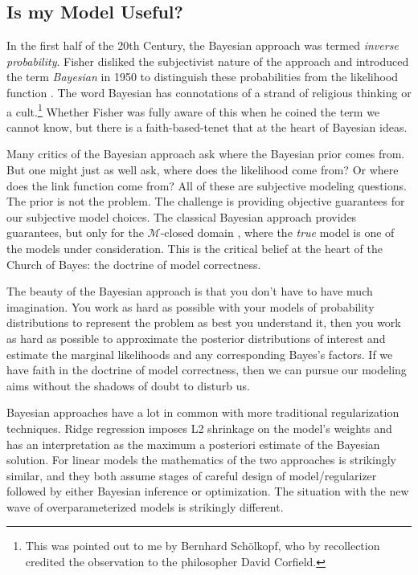\documentclass[a4paperpaper,]{article}
\begin{document}
\hypertarget{is-my-model-useful}{%
\subsection{Is my Model Useful?}\label{is-my-model-useful}}


In the first half of the 20th Century, the Bayesian approach was termed
\emph{inverse probability}. Fisher disliked the subjectivist nature of
the approach \citep{Aldrich-fisher08} and introduced the term
\emph{Bayesian} in 1950 to distinguish these probabilities from the
likelihood function \citep{Fisher-contributions50}. The word Bayesian
has connotations of a strand of religious thinking or a cult.\footnote{This
  was pointed out to me by Bernhard Schölkopf, who by recollection
  credited the observation to the philosopher David Corfield.} Whether
Fisher was fully aware of this when he coined the term we cannot know,
but there is a faith-based-tenet that at the heart of Bayesian ideas.

Many critics of the Bayesian approach ask where the Bayesian prior comes
from. But one might just as well ask, where does the likelihood come
from? Or where does the link function come from? All of these are
subjective modeling questions. The prior is not the problem. The
challenge is providing objective guarantees for our subjective model
choices. The classical Bayesian approach provides guarantees, but only
for the \(\mathcal{M}\)-closed domain \citep{Bernardo:bayesian94}, where
the \emph{true} model is one of the models under consideration. This is
the critical belief at the heart of the Church of Bayes: the doctrine of
model correctness.

The beauty of the Bayesian approach is that you don't have to have much
imagination. You work as hard as possible with your models of
probability distributions to represent the problem as best you
understand it, then you work as hard as possible to approximate the
posterior distributions of interest and estimate the marginal
likelihoods and any corresponding Bayes's factors. If we have faith in
the doctrine of model correctness, then we can pursue our modeling aims
without the shadows of doubt to disturb us.

Bayesian approaches have a lot in common with more traditional
regularization techniques. Ridge regression imposes L2 shrinkage on the
model's weights and has an interpretation as the maximum a posteriori
estimate of the Bayesian solution. For linear models the mathematics of
the two approaches is strikingly similar, and they both assume stages of
careful design of model/regularizer followed by either Bayesian
inference or optimization. The situation with the new wave of
overparameterized models is strikingly different.
\end{document}
